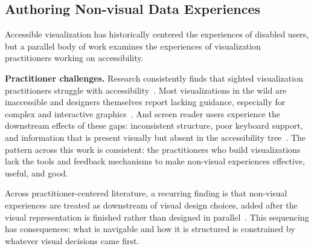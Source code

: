 \documentclass[12pt]{cmuthesis}
\begin{document}



\subsection{Authoring Non-visual Data Experiences}

Accessible visualization has historically centered the experiences of disabled users, but a parallel body of work examines the experiences of visualization practitioners working on accessibility.

\textbf{Practitioner challenges.} Research consistently finds that sighted visualization practitioners struggle with accessibility~\cite{Joyner2022Wild, Fan2023Accessibility, Sharif2024Challenges}. Most visualizations in the wild are inaccessible and designers themselves report lacking guidance, especially for complex and interactive graphics~\cite{Joyner2022Wild,Sharif2024Challenges}. And screen reader users experience the downstream effects of these gaps: inconsistent structure, poor keyboard support, and information that is present visually but absent in the accessibility tree~\cite{Sharif2021, Fan2023Accessibility}. The pattern across this work is consistent: the practitioners who build visualizations lack the tools and feedback mechanisms to make non-visual experiences effective, useful, and good.

Across practitioner-centered literature, a recurring finding is that non-visual experiences are treated as downstream of visual design choices, added after the visual representation is finished rather than designed in parallel~\cite{Joyner2022Wild, Lundgard2019Sociotechnical, Sharif2024Challenges, Zong2024}. This sequencing has consequences: what is navigable and how it is structured is constrained by whatever visual decisions came first.

\end{document}
